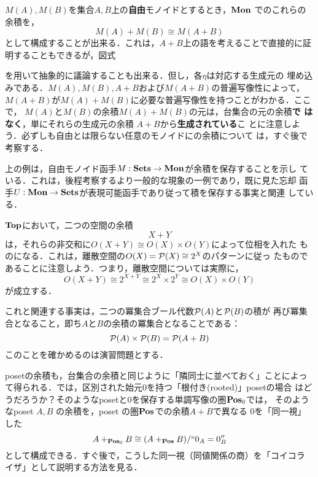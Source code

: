 \begin{example}
 $M(A), M(B)$を集合$A, B$上の{\bfseries 自由}モノイドとするとき，$\mathbf{Mon}$
 でのこれらの余積を，
 \[
  M(A) + M(B) \cong M(A+B)
 \]
 として構成することが出来る．これは，$A+B$上の語を考えることで直接的に証
 明することもできるが，図式
 \begin{center}
 \end{center}
 を用いて抽象的に議論することも出来る．但し，各$\eta$は対応する生成元の
 埋め込みである．$M(A), M(B), A+B$および$M(A+B)$の普遍写像性によって，
 $M(A+B)$が$M(A) + M(B)$に必要な普遍写像性を持つことがわかる．ここで，
 $M(A)$と$M(B)$の余積$M(A) + M(B)$の元は，台集合の元の余積{\bfseries で
 はなく}，単にそれらの生成元の余積 $A+B$から{\bfseries 生成されている}こ
 とに注意しよう．必ずしも自由とは限らない任意のモノイドにの余積について
 は，すぐ後で考察する．

 上の例は，自由モノイド函手$M: \mathbf{Sets} \to \mathbf{Mon}$が余積を保存することを示し
 ている．これは，後程考察するより一般的な現象の一例であり，既に見た忘却
 函手$U: \mathbf{Mon} \to \mathbf{Sets}$が表現可能函手であり従って積を保存する事実と関連
 している．
\end{example}

\begin{example}\label{ex:Coproduct in Top or Pos}
 ${\bf Top}$において，二つの空間の余積
 \[
  X + Y
 \]
 は，それらの非交和に$O(X+Y) \cong O(X) \times O(Y)$によって位相を入れた
 ものになる．これは，離散空間の$O(X) = \mathcal{P}(X) \cong 2^X$のパターンに従っ
 たものであることに注意しよう．つまり，離散空間については実際に，
 \[
  O(X+Y) \cong 2^{X+Y} \cong 2^X \times 2^Y \cong O(X) \times O(Y)
 \]
 が成立する．

 これと関連する事実は，二つの冪集合ブール代数$\mathcal{P}(A)$と$\mathcal{P}(B)$の積が
 再び冪集合となること，即ち$A$と$B$の余積の冪集合となることである：
 \[
  \mathcal{P}(A) \times \mathcal{P}(B) = \mathcal{P}(A + B)
 \]
 このことを確かめるのは演習問題とする．

 posetの余積も，台集合の余積と同じように「隣同士に並べておく」ことによっ
 て得られる．では，区別された始元$0$を持つ「根付き(rooted)」posetの場合
 はどうだろうか？そのようなposetと$0$を保存する単調写像の圏$\mathbf{Pos}_0$では，
 そのようなposet $A, B$ の余積を，poset の圏$\mathbf{Pos}$での余積$A+B$で異なる
 $0$を「同一視」した
 \[
  A +_{\mathbf{Pos}_0} B \cong (A +_{\mathbf{Pos}} B)/ ``0_A = 0_B ''
 \]
 として構成できる．すぐ後で，こうした同一視（同値関係の商）を「コイコラ
 イザ」として説明する方法を見る．
\end{example}

